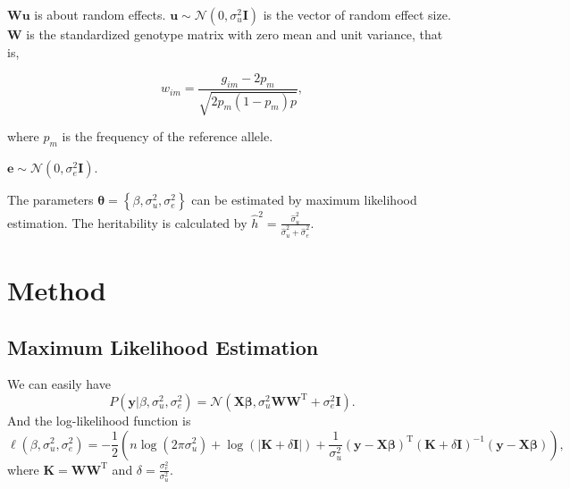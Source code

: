 \documentclass{article}
\begin{document}
$ \mathbf{W u} $ is about random effects. $ \mathbf{u} \sim \mathcal{N} (0, \sigma^{2}_{u} \mathbf{I}) $ is the vector of random effect size. $ \mathbf{W} $ is the standardized genotype matrix with zero mean and unit variance, that is,

\begin{equation}
	w_{im} = \frac{g_{im} - 2p_{m}}{\sqrt{2p_{m}(1-p_{m})p}},
\end{equation}

where $ p_{m} $ is the frequency of the reference allele.

$ \mathbf{e} \sim \mathcal{N} (0, \sigma^{2}_{e} \mathbf{I}) $.

The parameters $ \mathbf{\theta} = \left\lbrace \beta, \sigma^{2}_{u}, \sigma^{2}_{e} \right\rbrace $ can be estimated by maximum likelihood estimation. The heritability is calculated by $ \hat{h}^{2} = \frac{\hat{\sigma}^{2}_{u}}{\hat{\sigma}^{2}_{u} + \hat{\sigma}^{2}_{e}} $.

\section{Method}

\subsection{Maximum Likelihood Estimation}

We can easily have
\begin{equation}
	P(\mathbf{y} | \beta, \sigma^{2}_{u}, \sigma^{2}_{e}) = \mathcal{N}(\mathbf{X \beta}, \sigma^{2}_{u} \mathbf{WW}^{\mathrm{T}} + \sigma^{2}_{e}\mathbf{I}).
\end{equation}
And the log-likelihood function is
\begin{equation}\label{eq_loglikelihood}
	\ell(\beta, \sigma^{2}_{u}, \sigma^{2}_{e}) = -\frac{1}{2}( n \log(2 \pi \sigma^{2}_{u}) + \log(|\mathbf{K} + \delta \mathbf{I}|) + \frac{1}{\sigma^{2}_{u}} (\mathbf{y - X\beta})^{\mathrm{T}} (\mathbf{K} + \delta \mathbf{I})^{-1} (\mathbf{y - X\beta})),
\end{equation}
where $ \mathbf{K = WW}^{\mathrm{T}} $ and $ \delta = \frac{\sigma^{2}_{e}}{\sigma^{2}_{u}} $.
\vspace{1em}
\end{document}

